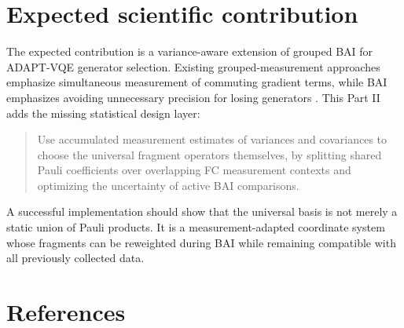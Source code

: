 \documentclass[11pt]{article}
\begin{document}
\section{Expected scientific contribution}

The expected contribution is a variance-aware extension of grouped BAI for ADAPT-VQE generator selection. Existing grouped-measurement approaches emphasize simultaneous measurement of commuting gradient terms, while BAI emphasizes avoiding unnecessary precision for losing generators \cite{Anastasiou2023ReallyMeasure,HuangIzmaylov2025QuantumGambling}. This Part II adds the missing statistical design layer:
\begin{quote}
Use accumulated measurement estimates of variances and covariances to choose the universal fragment operators themselves, by splitting shared Pauli coefficients over overlapping FC measurement contexts and optimizing the uncertainty of active BAI comparisons.
\end{quote}

A successful implementation should show that the universal basis is not merely a static union of Pauli products. It is a measurement-adapted coordinate system whose fragments can be reweighted during BAI while remaining compatible with all previously collected data.

\section{References}
\end{document}
